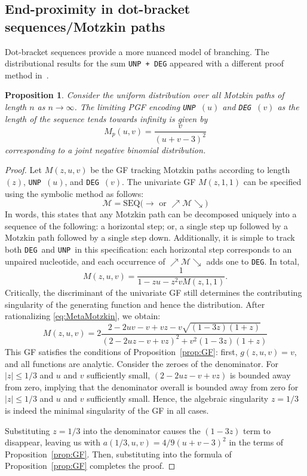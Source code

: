 \documentclass{article}
\newtheorem{proposition}[theorem]{Proposition}
\newcommand{\DEG}{{\tt DEG}}
\newcommand{\UNP}{{\tt UNP}}
\begin{document}
\subsection{End-proximity in dot-bracket sequences/Motzkin paths} \label{sec:Motzkin}
Dot-bracket sequences provide a more nuanced model of branching.
The distributional results for the sum {\tt UNP + DEG} appeared with a different proof method in~\cite[Theorem 3.1]{Banderier:2018}.

\begin{proposition} \label{lem:MotzkinPaths}
Consider the uniform distribution over all Motzkin paths of length $n$ as $n \to \infty$.  The limiting PGF encoding \UNP\ $(u)$ and \DEG\ $(v)$ as the length of the sequence tends towards infinity is given by
\[
M_p(u, v) = \frac{v}{(u + v - 3)^2}
\]
corresponding to a joint negative binomial distribution. 
\end{proposition}

\begin{proof}
    Let $M(z, u, v)$ be the GF tracking Motzkin paths according to length $(z)$, \UNP\ $(u)$, and \DEG\ $(v)$.  The univariate GF $M(z, 1, 1)$ can be specified using the symbolic method as follows:
        \begin{equation*} \label{eq:MotzkinSpecification}
    \mathcal{M} = \mbox{SEQ}\bigg(\rightarrow \mbox{ or } \nearrow \mathcal{M} \searrow\bigg)
    \end{equation*}
    In words, this states that any Motzkin path can be decomposed uniquely into a sequence of the following: a horizontal step; or, a single step up followed by a Motzkin path followed by a single step down.  Additionally, it is simple to track both \DEG\ and \UNP\ in this specification: each horizontal step corresponds to an unpaired nucleotide, and each occurrence of $\nearrow \mathcal{M} \searrow$ adds one to \DEG.  In total,
    \begin{equation} \label{eq:MetaMotzkin}
    M(z, u, v) = \frac{1}{1 - zu - z^2v M(z, 1, 1)}.
    \end{equation}
  Critically, the discriminant of the univariate GF still determines the contributing singularity of the generating function and hence the distribution.  After rationalizing \eqref{eq:MetaMotzkin}, we obtain:
    \[
    M(z, u, v) = 2\frac{2 - 2uv - v + vz - v\sqrt{(1-3z)(1+z)}}{(2-2uz-v+vz)^2 + v^2(1-3z)(1+z)}
    \]
    This GF satisfies the conditions of Proposition~\ref{prop:GF}: first, $g(z, u, v) = v$, and all functions are analytic.  Consider the zeroes of the denominator.  For $|z| \leq 1/3$ and $u$ and $v$ sufficiently small, $(2-2uz-v+vz)$ is bounded away from zero, implying that the denominator overall is bounded away from zero for $|z| \leq 1/3$ and $u$ and $v$ sufficiently small. Hence, the algebraic singularity $z = 1/3$ is indeed the minimal singularity of the GF in all cases.

   Substituting $z = 1/3$ into the denominator causes the $(1-3z)$ term to disappear, leaving us with $a(1/3, u, v) = 4/9(u + v - 3)^2$ in the terms of Proposition~\ref{prop:GF}.  Then, substituting into the formula of Proposition~\ref{prop:GF} completes the proof.

\end{proof}
\end{document}
